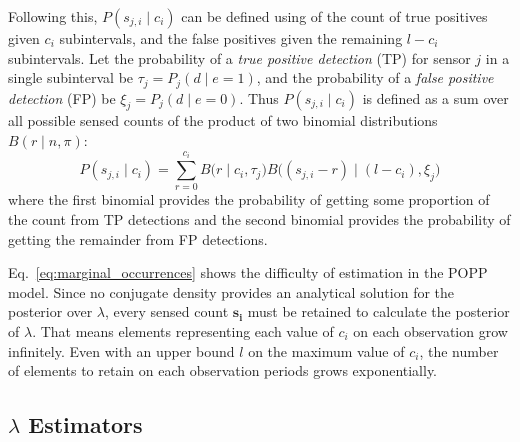Following this, $P(s_{j,i} \mid c_i)$ can be defined using of the count of true  positives given $c_i$ subintervals, and the false positives given the remaining $l-c_i$ subintervals. 
% 
Let the probability of a \textit{true positive detection} (TP) for sensor $j$ in a single subinterval be $\tau_j=P_j(d \mid e{=}1)$, and the probability of a \textit{false positive detection} (FP) be $\xi_j = P_j(d \mid e{=}0)$. Thus $P(s_{j,i} \mid c_i)$ is defined as a sum over all possible sensed counts of the product of two binomial distributions $B(r \mid n,\pi)$: 
\begin{equation}
	\label{eq:joint_binomial_distribution}
    P(s_{j,i} \mid c_i) \! = \! \! \! \displaystyle\sum_{r = 0}^{c_{i}} \! \! B\Big(r \mid c_i, \tau_j\Big) B\Big((s_{j,i} - r) \mid (l - c_{i}), \xi_j \Big)
\end{equation}
\noindent where the first binomial provides the probability of getting some proportion of the count from  TP detections and the second binomial provides the probability of getting the remainder from FP detections. 


Eq.~\ref{eq:marginal_occurrences} shows the difficulty of estimation in the POPP model. Since no conjugate density provides an analytical solution for the posterior over $\lambda$, every sensed count $\mathbf{s_i}$ must be retained to calculate the posterior of $\lambda$. That means elements representing each value of $c_i$ on each observation grow infinitely. Even with an upper bound $l$ on the maximum value of $c_i$, the number of elements to retain on each observation periods grows exponentially.

% 
\subsection*{$\lambda$ Estimators}\label{sec:estimators}

